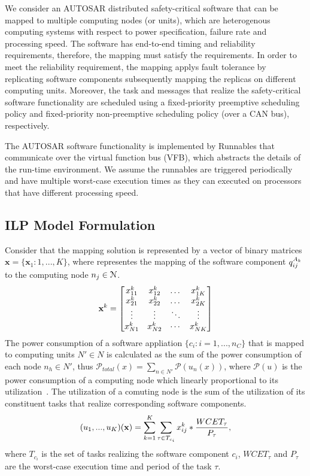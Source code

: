 We consider an AUTOSAR distributed safety-critical software that can be mapped to multiple computing nodes (or units), which are heterogenous computing systems with respect to power specification, failure rate and processing speed. The software has end-to-end timing and reliability requirements, therefore, the mapping must satisfy the requirements. In order to meet the reliability requirement, the mapping applys fault tolerance by replicating software components subsequently mapping the replicas on different computing units. Moreover, the task and messages that realize the safety-critical software functionality are scheduled using a fixed-priority preemptive scheduling policy and fixed-priority non-preemptive scheduling policy (over a  CAN bus), respectively.

The AUTOSAR software functionality is implemented by Runnables that communicate over the virtual function bus (VFB), which abstracts the details of the run-time environment. We assume the runnables are triggered periodically and have multiple worst-case execution times as they can executed on processors that have different processing speed.

\subsection{ILP Model Formulation}
Consider that the mapping solution is represented by a vector of binary matrices $\textbf{x}=\{\textbf{x}_1:1,...,K\}$, where \ttxkij representes the mapping of the software component $\sss{q}[k][ij]$ to the computing node $\ssb{n}[j]\in \mathcal{N}$. 
\begin{equation}
\label{eqn_solution}
\bspx{k}=
\begin{bmatrix} 
\ssx{k}{11} & \ssx{k}{12} & \dots & \ssx{k}{1K}\\
\ssx{k}{21} & \ssx{k}{22} & \dots & \ssx{k}{2K}\\
\vdots & \vdots & \ddots & \vdots\\
\ssx{k}{N1} & \ssx{k}{N2} & \cdots & \ssx{k}{NK}
\end{bmatrix}
\end{equation}
The power consumption of a software appliation $\{c_i:i=1,...,n_C\}$ that is mapped to computing units $N'\in N$ is calculated as the sum of the power consumption of each node $n_h\in N'$, thus $\mathcal{P}_{total}(x)=\sum_{n\in N'}{\mathcal{P}(u_n(x))}$, where $\mathcal{P}(u)$ is the power consumption of a computing node which linearly proportional to its utilization~\cite{Mahmud5222}. The utilization of a comuting node is the sum of the utilization of its constituent tasks that realize corresponding software components.
\begin{align}
	(u_1,...,u_K)(\textbf{x})=\sum_{k=1}^{K}\sum_{\tau\in T_{c_i}}{x^{k}_{ij}*\frac{WCET_\tau}{P_\tau}},
\end{align}
where $T_{c_i}$ is the set of tasks realizing the software component $c_i$, $WCET_\tau$ and $P_\tau$ are the worst-case execution time and  period of the task $\tau$.

